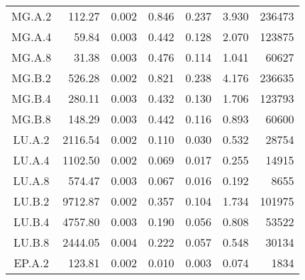 \begin{threeparttable}
\begin{longtable}[c]{c*{6}{r}}
        MG.A.2                 & 112.27                              & 0.002                               & 0.846          & 0.237 & 3.930 & 236473 \\
        MG.A.4                 & 59.84                               & 0.003                               & 0.442          & 0.128 & 2.070 & 123875 \\
        MG.A.8                 & 31.38                               & 0.003                               & 0.476          & 0.114 & 1.041 & 60627  \\
        MG.B.2                 & 526.28                              & 0.002                               & 0.821          & 0.238 & 4.176 & 236635 \\
        MG.B.4                 & 280.11                              & 0.003                               & 0.432          & 0.130 & 1.706 & 123793 \\
        MG.B.8                 & 148.29                              & 0.003                               & 0.442          & 0.116 & 0.893 & 60600  \\
        LU.A.2                 & 2116.54                             & 0.002                               & 0.110          & 0.030 & 0.532 & 28754  \\
        LU.A.4                 & 1102.50                             & 0.002                               & 0.069          & 0.017 & 0.255 & 14915  \\
        LU.A.8                 & 574.47                              & 0.003                               & 0.067          & 0.016 & 0.192 & 8655   \\
        LU.B.2                 & 9712.87                             & 0.002                               & 0.357          & 0.104 & 1.734 & 101975 \\
        LU.B.4                 & 4757.80                             & 0.003                               & 0.190          & 0.056 & 0.808 & 53522  \\
        LU.B.8                 & 2444.05                             & 0.004                               & 0.222          & 0.057 & 0.548 & 30134  \\
        EP.A.2                 & 123.81                              & 0.002                               & 0.010          & 0.003 & 0.074 & 1834   \\ \bottomrule
    \end{longtable}
\end{threeparttable}

